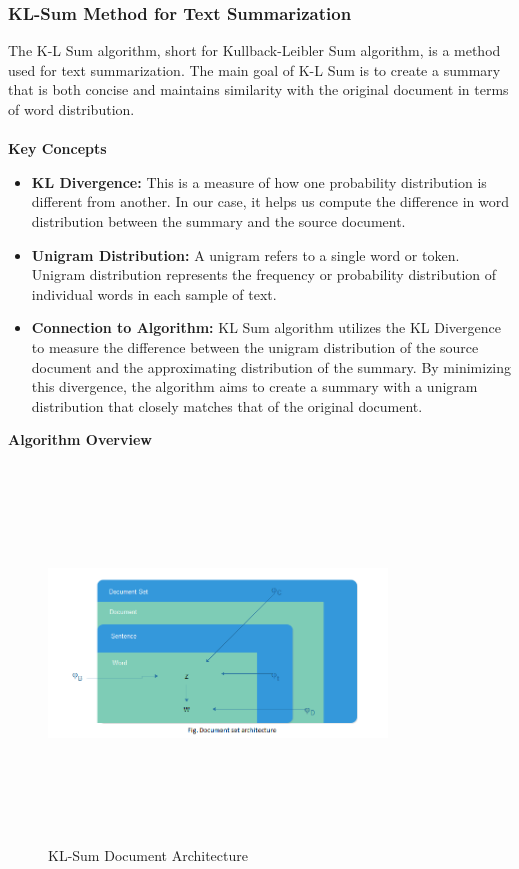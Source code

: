 \documentclass{ieeeaccess}
\begin{document}
\subsubsection{KL-Sum Method for Text Summarization}
The K-L Sum algorithm, short for Kullback-Leibler Sum algorithm, is a method used for text summarization. The main goal of K-L Sum is to create a summary that is both concise and maintains similarity with the original document in terms of word distribution.\cite{klsum}\\\\
\textbf{Key Concepts}
\begin{itemize}
    \item \textbf{KL Divergence:} This is a measure of how one probability distribution is different from another. In our case, it helps us compute the difference in word distribution between the summary and the source document.
    \item \textbf{Unigram Distribution:} A unigram refers to a single word or token. Unigram distribution represents the frequency or probability distribution of individual words in each sample of text.
    \item \textbf{Connection to Algorithm:} KL Sum algorithm utilizes the KL Divergence to measure the difference between the unigram distribution of the source document and the approximating distribution of the summary. By minimizing this divergence, the algorithm aims to create a summary with a unigram distribution that closely matches that of the original document.
\end{itemize}
\textbf{Algorithm Overview}\cite{kl}  

\begin{figure}	[!htb]
    \centering
    \includegraphics[width=9cm, height=10cm, keepaspectratio]{KL arch.png}
    \caption{KL-Sum Document Architecture}
    \label{klsum_arch}
\end{figure} 
\end{document}
